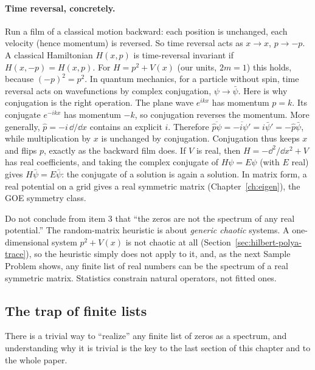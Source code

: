 \paragraph{Time reversal, concretely.} Run a film of a classical motion backward: each position is unchanged, each velocity (hence momentum) is reversed. So time reversal acts as $x\to x$, $p\to-p$. A classical Hamiltonian $H(x,p)$ is time-reversal invariant if $H(x,-p)=H(x,p)$. For $H=p^2+V(x)$ (our units, $2m=1$) this holds, because $(-p)^2=p^2$. In quantum mechanics, for a particle without spin, time reversal acts on wavefunctions by complex conjugation, $\psi\to\bar\psi$. Here is why conjugation is the right operation. The plane wave $e^{ikx}$ has momentum $p=k$. Its conjugate $e^{-ikx}$ has momentum $-k$, so conjugation reverses the momentum. More generally, $\hat p=-i\,\dd/\dd x$ contains an explicit $i$. Therefore $\overline{\hat p\psi}=\overline{-i\psi'}=i\bar\psi'=-\hat p\bar\psi$, while multiplication by $x$ is unchanged by conjugation. Conjugation thus keeps $x$ and flips $p$, exactly as the backward film does. If $V$ is real, then $H=-\dd^2/\dd x^2+V$ has real coefficients, and taking the complex conjugate of $H\psi=E\psi$ (with $E$ real) gives $H\bar\psi=E\bar\psi$: the conjugate of a solution is again a solution. In matrix form, a real potential on a grid gives a real symmetric matrix (Chapter~\ref{ch:eigen}), the GOE symmetry class.

\begin{pitfall}
Do not conclude from item 3 that ``the zeros are not the spectrum of any real potential.'' The random-matrix heuristic is about \emph{generic chaotic} systems. A one-dimensional system $p^2+V(x)$ is not chaotic at all (Section~\ref{sec:hilbert-polya-trace}), so the heuristic simply does not apply to it, and, as the next Sample Problem shows, any finite list of real numbers can be the spectrum of a real symmetric matrix. Statistics constrain natural operators, not fitted ones.
\end{pitfall}

\subsection{The trap of finite lists}

There is a trivial way to ``realize'' any finite list of zeros as a spectrum, and understanding why it is trivial is the key to the last section of this chapter and to the whole paper.

